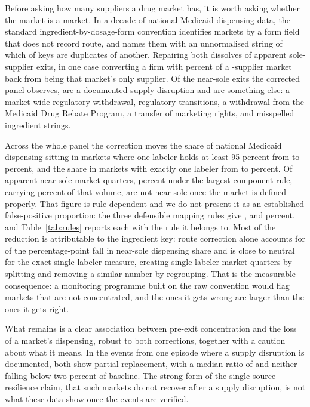 \documentclass[pdflatex,sn-vancouver-num,Numbered]{sn-jnl}
\begin{document}
Before asking how many suppliers a drug market has, it is worth asking whether the market is a
market. In a decade of national Medicaid dispensing data, the standard
ingredient-by-dosage-form convention identifies markets by a form field that does not record
route, and names them with an unnormalised string of which \nKeysAbsorbed of \nRawKeys keys are duplicates of
another. Repairing both dissolves \nReclassSoleW of \nRawSoleW apparent sole-supplier exits, in one
case converting a firm with \nPregShare percent of a \nPregLabelers-supplier market back from being that
market's only supplier. Of the \nCauseTotal near-sole exits the corrected panel observes,
\nCauseSupplyW are a documented supply disruption and \nCauseExplainedW are something else: a
market-wide regulatory withdrawal, \nCauseTransitionW regulatory transitions, a withdrawal from
the Medicaid Drug Rebate Program, a transfer of marketing rights, and \nCauseArtefactW
misspelled ingredient strings.

Across the whole panel the correction moves the share of national Medicaid dispensing sitting in
markets where one labeler holds at least 95 percent from \nNearSoleVolA to \nNearSoleVolC percent, and the share in
markets with exactly one labeler from \nSingleVolA to \nSingleVolC percent. Of apparent near-sole market-quarters, \nReclassRate percent
under the largest-component rule, carrying \nReclassVolLargest
percent of that volume, are not near-sole once the market is defined properly. That figure is
rule-dependent and we do not present it as an established false-positive proportion: the three
defensible mapping rules give \nReclassLow, \nReclassRate and \nReclassHigh percent, and
Table~\ref{tab:rules} reports each with the rule it belongs to. Most of the reduction is attributable to the ingredient key: route
correction alone accounts for \nRoutePP of the \nNearSolePP percentage-point fall in near-sole dispensing
share and is close to neutral for the exact single-labeler measure, creating \nRouteSplitCreated single-labeler
market-quarters by splitting and removing a similar number by regrouping. That is the measurable consequence: a monitoring programme built
on the raw convention would flag markets that are not concentrated, and the ones it gets wrong
are larger than the ones it gets right.

What remains is a clear association between pre-exit concentration and the loss of a market's
dispensing, robust to both corrections, together with a caution about what it means. In the \nCauseSupplyW
events from one episode where a supply disruption is documented, both show partial replacement,
with a median ratio of \nSupplyMedian and neither falling below two percent of baseline. The strong form of the single-source resilience claim, that such markets do not
recover after a supply disruption, is not what these data show once the events are verified.
\end{document}
